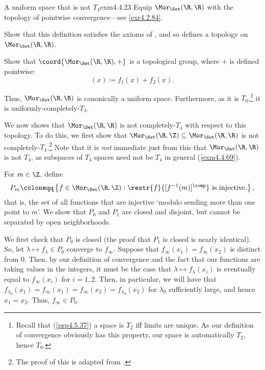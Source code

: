 \begin{exm}{A uniform space that is not $T_4$}{exm4.4.23}
Equip $\Mor _{\Set}(\R ,\R )$ with the topology of pointwise convergence---see \cref{exr4.2.84}.
\begin{exr}[breakable=false]{}{}
Show that this definition satisfies the axioms of , and so defines a topology on $\Mor _{\Set}(\R ,\R )$.
\end{exr}
\begin{exr}[breakable=false]{}{}
Show that $\coord{\Mor _{\Set}(\R ,\R ),+}$ is a topological group, where $+$ is defined pointwise:
\begin{equation}
[f_1+f_2](x)\coloneqq f_1(x)+f_2(x).
\end{equation}
\end{exr}
Thus, $\Mor _{\Set}(\R ,\R )$ is canonically a uniform space.  Furthermore, as it is $T_0$,\footnote{Recall that (\cref{prp4.5.37}) a space is $T_2$ iff limits are unique.  As our definition of convergence obviously has this property, our space is automatically $T_2$, hence $T_0$.} it is uniformly-completely-$T_3$.

We now shows that $\Mor _{\Set}(\R ,\R )$ is not completely-$T_4$ with respect to this topology.  To do this, we first show that $\Mor _{\Set}(\R ,\Z )\subseteq \Mor _{\Set}(\R ,\R )$ is not completely-$T_4$.\footnote{The proof of this is adapted from \cite[pg.~206]{Munkres}.}  Note that it is \emph{not} immediate just from this that $\Mor _{\Set}(\R ,\R )$ is not $T_4$, as subspaces of $T_4$ spaces need not be $T_4$ in general (\cref{exm4.4.69}).

For $m\in \Z$, define
\begin{equation}
P_m\coloneqq \left\{ f\in \Mor _{\Set}(\R ,\Z ):\restr{f}{[f^{-1}(m)]^{\comp}}\text{ is injective.}\right\} ,
\end{equation}
that is, the set of all functions that are injective `modulo sending more than one point to $m$'.  We show that $P_0$ and $P_1$ are closed and disjoint, but cannot be separated by open neighborhoods.

We first check that $P_0$ is closed (the proof that $P_1$ is closed is nearly identical).  So, let $\lambda \mapsto f_\lambda \in P_0$ converge to $f_\infty$.  Suppose that $f_\infty (x_1)=f_\infty (x_2)$ is distinct from $0$.  Then, by our definition of convergence and the fact that our functions are taking values in the integers, it must be the case that $\lambda \mapsto f_\lambda (x_i)$ is eventually equal to $f_\infty (x_i)$ for $i=1,2$.  Then, in particular, we will have that $f_{\lambda _0}(x_1)=f_{\infty}(x_1)=f_{\infty}(x_2)=f_{\lambda _0}(x_2)$ for $\lambda _0$ sufficiently large, and hence $x_1=x_2$.  Thus, $f_\infty \in P_0$.


\end{exm}
